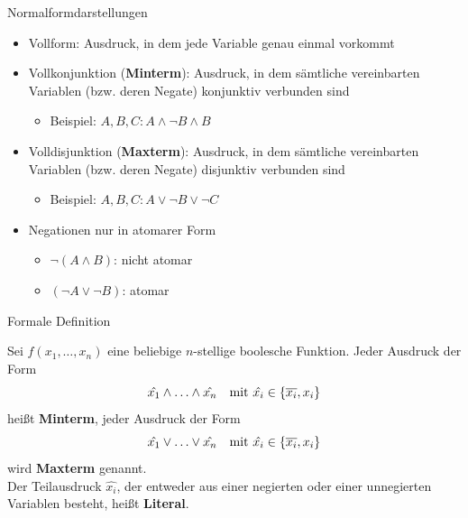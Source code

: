 \documentclass[12pt%
,aspectratio=169%
]{beamer}
\begin{document}
\begin{frame}{Normalformdarstellungen}
\begin{itemize}
	\item Vollform: Ausdruck, in dem jede Variable genau einmal vorkommt 
	\item Vollkonjunktion (\textbf{Minterm}): Ausdruck, in dem sämtliche vereinbarten Variablen (bzw. deren Negate) konjunktiv verbunden sind 
	\begin{itemize}
		\item Beispiel: $A,B,C: A \land \neg B \land B$
	\end{itemize}
	\item Volldisjunktion (\textbf{Maxterm}): Ausdruck, in dem sämtliche vereinbarten Variablen (bzw. deren Negate) disjunktiv verbunden sind
	\begin{itemize}
		\item Beispiel: $A,B,C: A \lor \neg B \lor \neg C$
	\end{itemize}
	\item Negationen nur in atomarer Form
	\begin{itemize}
		\item $\neg(A \land B)$: nicht atomar  
		\item $(\neg A \lor \neg B)$: atomar
	\end{itemize}
\end{itemize}
\end{frame}

\begin{frame}{Formale Definition}
\begin{definition}
Sei $f(x_1 ,\ldots , x_n)$ eine beliebige $n$-stellige boolesche Funktion. Jeder Ausdruck der Form
$$
	\hat{x_1} \land \ldots \land \hat{x_n} \text{\quad mit } \hat{x_i} \in \{\overline{x_i}, x_i\} 
$$
heißt \textbf{Minterm}, jeder Ausdruck der Form
$$
	\hat{x_1} \lor \ldots \lor \hat{x_n} \text{\quad mit } \hat{x_i} \in \{\overline{x_i}, x_i\} 
$$
wird \textbf{Maxterm} genannt.\\
Der Teilausdruck $\hat{x_i}$, der entweder aus einer negierten oder einer unnegierten Variablen besteht, heißt \textbf{Literal}.
\end{definition}
\end{frame}
\end{document}
